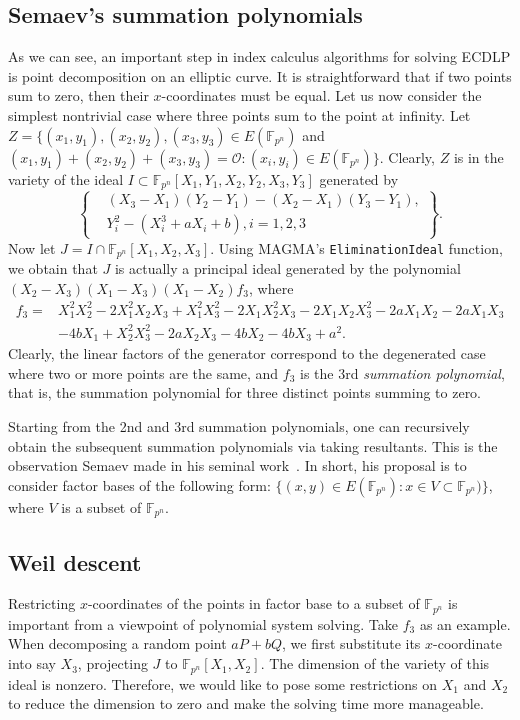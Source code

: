 \documentclass{llncs}
\newcommand{\F}[1]{\ensuremath{\mathbb F_{#1}}}
\begin{document}
\subsection{Semaev's summation polynomials}
%
\label{sec:summation-polynomials}
%
As we can see, an important step in index calculus algorithms for
solving ECDLP is point decomposition on an elliptic curve.
%
It is straightforward that if two points sum to zero, then their
$x$-coordinates must be equal.
%
Let us now consider the simplest nontrivial case where three points
sum to the point at infinity.
%
Let $Z=\{(x_1,y_1),(x_2,y_2),(x_3,y_3)\in E(\F{p^n})$ and
$(x_1,y_1)+(x_2,y_2)+(x_3,y_3)=\mathcal O:(x_i,y_i)\in E(\F{p^n})\}$.
%
Clearly, $Z$ is in the variety of the ideal
$I\subset\F{p^n}[X_1,Y_1,X_2,Y_2,X_3,Y_3]$ generated by
\[ \left\{\begin{aligned}
      &  (X_3 - X_1)(Y_2 - Y_1) - (X_2 - X_1)(Y_3 - Y_1),\\
      & Y_i^2 - (X_i^3 + aX_i + b),i=1,2,3
    \end{aligned}\right\}. \]
%
Now let $J=I\cap\F{p^n}[X_1,X_2,X_3]$.
%
Using MAGMA's \texttt{EliminationIdeal} function, we obtain that $J$
is actually a principal ideal generated by the polynomial
$(X_2 - X_3)(X_1 - X_3)(X_1 - X_2)f_3$, where \[ \begin{aligned}
    f_3 = & X_1^2X_2^2 - 2X_1^2X_2X_3 + X_1^2X_3^2 - 2X_1X_2^2X_3 - 2X_1X_2X_3^2 - 2aX_1X_2 - 2aX_1X_3 \\
    & - 4bX_1 + X_2^2X_3^2 - 2aX_2X_3 - 4bX_2 - 4bX_3 + a^2.
  \end{aligned} \]
%
Clearly, the linear factors of the generator correspond to the
degenerated case where two or more points are the same, and $f_3$ is
the 3rd \emph{summation polynomial}, that is, the summation polynomial
for three distinct points summing to zero.

Starting from the 2nd and 3rd summation polynomials, one can
recursively obtain the subsequent summation polynomials via taking
resultants.
%
This is the observation Semaev made in his seminal
work~\cite{DBLP:journals/iacr/Semaev04}.
%
In short, his proposal is to consider factor bases of the following
form: $\{(x,y)\in E(\F{p^n}):x\in V\subset\F{p^n})\}$, where $V$ is a
subset of \F{p^n}.

\subsection{Weil descent}
%
Restricting $x$-coordinates of the points in factor base to a subset
of \F{p^n} is important from a viewpoint of polynomial system solving.
%
Take $f_3$ as an example.
%
When decomposing a random point $aP+bQ$, we first substitute its
$x$-coordinate into say $X_3$, projecting $J$ to $\F{p^n}[X_1,X_2]$.
%
The dimension of the variety of this ideal is nonzero.
%
Therefore, we would like to pose some restrictions on $X_1$ and $X_2$
to reduce the dimension to zero and make the solving time more
manageable.
\end{document}
